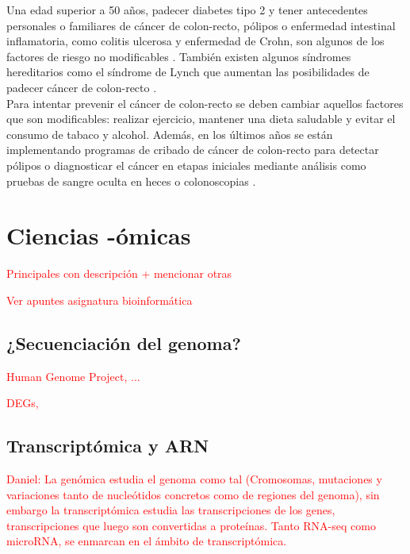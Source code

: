 Una edad superior a 50 años, padecer diabetes tipo 2 y tener antecedentes personales o familiares de cáncer de colon-recto, pólipos o enfermedad intestinal inflamatoria, como colitis ulcerosa y enfermedad de Crohn, son algunos de los factores de riesgo no modificables \cite{AmericanCancerSociety2020}. También existen algunos síndromes hereditarios como el síndrome de Lynch que aumentan las posibilidades de padecer cáncer de colon-recto \cite{Lynch2003}.\\

Para intentar prevenir el cáncer de colon-recto se deben cambiar aquellos factores que son modificables: realizar ejercicio, mantener una dieta saludable y evitar el consumo de tabaco y alcohol. Además, en los últimos años se están implementando programas de cribado de cáncer de colon-recto para detectar pólipos o diagnosticar el cáncer en etapas iniciales mediante análisis como pruebas de sangre oculta en heces o colonoscopias \cite{Levin2008}.\\


\section{Ciencias -ómicas}

\textcolor{red}{Principales con descripción + mencionar otras}

\textcolor{red}{Ver apuntes asignatura bioinformática}

\subsection{¿Secuenciación del genoma?}

\textcolor{red}{Human Genome Project, ...}

\textcolor{red}{DEGs, }

\subsection{Transcriptómica y ARN}

\textcolor{red}{Daniel: La
	genómica estudia el genoma como tal (Cromosomas, mutaciones y
	variaciones tanto de nucleótidos concretos como de regiones del genoma),
	sin embargo la transcriptómica estudia las transcripciones de los genes,
	transcripciones que luego son convertidas a proteínas. Tanto RNA-seq
	como microRNA, se enmarcan en el ámbito de transcriptómica.}


